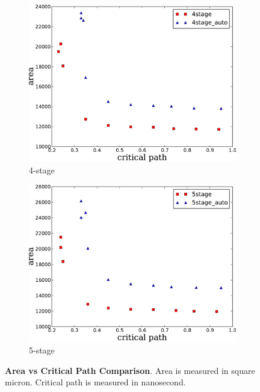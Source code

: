 \begin{figure}[htb]
\begin{subfigure}[t]{0.47\textwidth}
  \label{fig:3stage}
  \vspace{20pt}
  \end{subfigure}
  \hfill
  \begin{subfigure}[t]{0.47\textwidth}
  \centering
  \includegraphics[width=\textwidth]{figures/4stage.pdf}
  \caption{4-stage}
  \label{fig:4stage}
  \end{subfigure}
  \hfill
  \begin{subfigure}[t]{0.47\textwidth}
  \centering
  \includegraphics[width=\textwidth]{figures/5stage.pdf}
  \caption{5-stage}
  \label{fig:5stage}
  \end{subfigure}
\caption{{\bf Area vs Critical Path Comparison}. Area is measured in
  square micron. Critical path is measured in nanosecond.}
\label{fig:area-time}
\end{figure}

